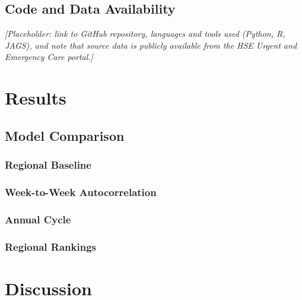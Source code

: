 \documentclass[
]{article}
\begin{document}
\subsection{\texorpdfstring{Code and Data Availability \label{sect:code}}{Code and Data Availability }}\label{code-and-data-availability}

\textit{[Placeholder: link to GitHub repository, languages and tools used (Python, R, JAGS), and note that source data is publicly available from the HSE Urgent and Emergency Care portal.]}

\section{\texorpdfstring{Results \label{chap:results}}{Results }}\label{results}

\subsection{\texorpdfstring{Model Comparison \label{sect:dic-results}}{Model Comparison }}\label{model-comparison}

\subsubsection{Regional Baseline}\label{regional-baseline}

\subsubsection{Week-to-Week Autocorrelation}\label{week-to-week-autocorrelation}

\subsubsection{Annual Cycle}\label{annual-cycle}

\subsubsection{Regional Rankings}\label{regional-rankings}

\newpage

\section{\texorpdfstring{Discussion \label{chap:Discussion}}{Discussion }}\label{discussion}

\newpage
\end{document}
